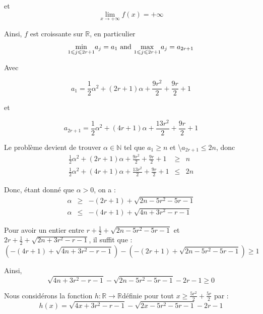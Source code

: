 et
\[ \underset{x \rightarrow + \infty}{\lim} f (x) = + \infty \]


Ainsi, $f$ est croissante sur $\mathbb{R}$, en particulier
\[ \underset{1 \leqslant j \leqslant 2 r + 1}{\min} a_j = a_1 \text{ and }
   \underset{1 \leqslant j \leqslant 2 r + 1}{\max} a_j = a_{2 r + 1} \]


Avec

\[ a_1 = \frac{1}{2} \alpha^2 + (2 r + 1) \alpha + \frac{9 r^2}{2} +
   \frac{9 r}{2} + 1 \]

et

\[ a_{2 r + 1} = \frac{1}{2} \alpha^2 + (4 r + 1) \alpha + \frac{13 r^2}{2} +
   \frac{9 r}{2} + 1 \]


Le probl{\`e}me devient de trouver $\alpha \in \mathbb{N}$ tel que $a_1
\geqslant n$ et \textbackslash$a_{2 r + 1} \leqslant 2 n$, donc
\begin{eqnarray*}
  \frac{1}{2} \alpha^2 + (2 r + 1) \alpha + \frac{9 r^2}{2} + \frac{9 r}{2} +
  1 & \geqslant & n\\
  \frac{1}{2} \alpha^2 + (4 r + 1) \alpha + \frac{13 r^2}{2} + \frac{9 r}{2} +
  1 & \leqslant & 2 n
\end{eqnarray*}


Donc, {\'e}tant donn{\'e} que $\alpha > 0$, on a :
\begin{eqnarray*}
  \alpha & \geqslant & - (2 r + 1) + \sqrt{2 n - 5 r^2 - 5 r - 1}\\
  \alpha & \leqslant & - (4 r + 1) + \sqrt{4 n + 3 r^2 - r - 1}
\end{eqnarray*}


Pour avoir un entier entre $r + \frac{1}{2} + \sqrt{2 n - 5 r^2 - 5 r - 1}$ et
$2 r + \frac{1}{2} + \sqrt{2 n + 3 r^2 - r - 1}$, il suffit que :
\[ \left( - (4 r + 1) + \sqrt{4 n + 3 r^2 - r - 1} \right) - \left( - (2 r +
   1) + \sqrt{2 n - 5 r^2 - 5 r - 1} \right) \geqslant 1 \]


Ainsi,
\[ \sqrt{4 n + 3 r^2 - r - 1} - \sqrt{2 n - 5 r^2 - 5 r - 1} - 2 r - 1
   \geqslant 0 \]


Nous consid{\'e}rons la fonction $h : \mathbb{R} \rightarrow
\mathbb{R}$d{\'e}finie pour tout $x \geqslant \frac{5 r^2}{2} + \frac{5 r}{2}$
par :
\[ h (x) = \sqrt{4 x + 3 r^2 - r - 1} - \sqrt{2 x - 5 r^2 - 5 r - 1} - 2 r - 1
\]


